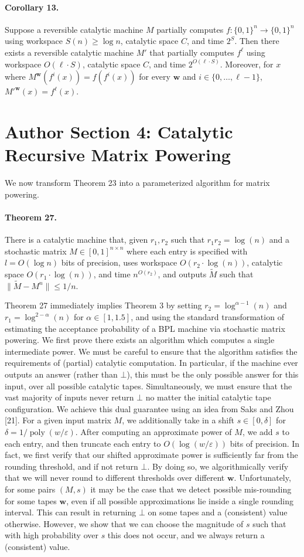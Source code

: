 \documentclass[10pt,a4paper]{article}
\begin{document}
\paragraph{Corollary 13.} Suppose a reversible catalytic machine $M$ partially computes $f:\{0,1\}^n\to\{0,1\}^n$ using workspace $S(n)\geq\log n$, catalytic space $C$, and time $2^S$. Then there exists a reversible catalytic machine $M'$ that partially computes $f^\ell$ using workspace $O(\ell\cdot S)$, catalytic space $C$, and time $2^{O(\ell\cdot S)}$. Moreover, for $x$ where $M^{\mathbf w}(f^i(x))=f(f^i(x))$ for every $\mathbf w$ and $i\in\{0,\ldots,\ell-1\}$, $M'^{\mathbf w}(x)=f^\ell(x)$.
\section*{Author Section 4: Catalytic Recursive Matrix Powering}
We now transform Theorem 23 into a parameterized algorithm for matrix powering.

\paragraph{Theorem 27.} There is a catalytic machine that, given $r_1,r_2$ such that $r_1r_2=\log(n)$ and a stochastic matrix $M\in[0,1]^{n\times n}$ where each entry is specified with $l=O(\log n)$ bits of precision, uses workspace $O(r_2\cdot\log(n))$, catalytic space $O(r_1\cdot\log(n))$, and time $n^{O(r_2)}$, and outputs $\widetilde M$ such that $\|\widetilde M-M^n\|\leq1/n$.

Theorem 27 immediately implies Theorem 3 by setting $r_2=\log^{\alpha-1}(n)$ and $r_1=\log^{2-\alpha}(n)$ for $\alpha\in[1,1.5]$, and using the standard transformation of estimating the acceptance probability of a BPL machine via stochastic matrix powering.
We first prove there exists an algorithm which computes a single intermediate power. We must be careful to ensure that the algorithm satisfies the requirements of (partial) catalytic computation. In particular, if the machine ever outputs an answer (rather than $\bot$), this must be the only possible answer for this input, over all possible catalytic tapes. Simultaneously, we must ensure that the vast majority of inputs never return $\bot$ no matter the initial catalytic tape configuration.
We achieve this dual guarantee using an idea from Saks and Zhou [21]. For a given input matrix $M$, we additionally take in a shift $s\in[0,\delta]$ for $\delta=1/\operatorname{poly}(w/\varepsilon)$. After computing an approximate power of $M$, we add $s$ to each entry, and then truncate each entry to $O(\log(w/\varepsilon))$ bits of precision. In fact, we first verify that our shifted approximate power is sufficiently far from the rounding threshold, and if not return $\bot$. By doing so, we algorithmically verify that we will never round to different thresholds over different $\mathbf w$. Unfortunately, for some pairs $(M,s)$ it may be the case that we detect possible mis-rounding for some tapes $\mathbf w$, even if all possible approximations lie inside a single rounding interval. This can result in returning $\bot$ on some tapes and a (consistent) value otherwise. However, we show that we can choose the magnitude of $s$ such that with high probability over $s$ this does not occur, and we always return a (consistent) value.
\end{document}
